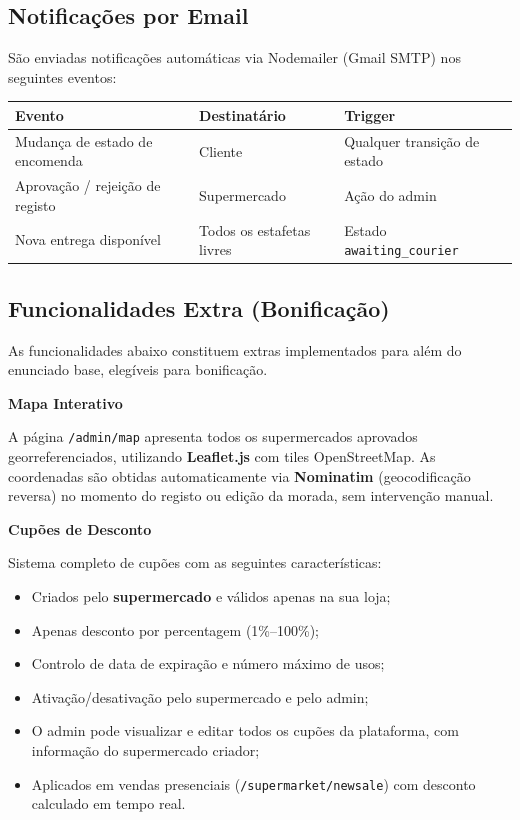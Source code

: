 \documentclass[12pt,a4paper]{article}
\begin{document}
\subsection{Notificações por Email}

São enviadas notificações automáticas via Nodemailer (Gmail SMTP) nos seguintes eventos:

\begin{center}
\begin{tabular}{lll}
\toprule
\textbf{Evento} & \textbf{Destinatário} & \textbf{Trigger} \\
\midrule
Mudança de estado de encomenda & Cliente & Qualquer transição de estado \\
Aprovação / rejeição de registo & Supermercado & Ação do admin \\
Nova entrega disponível & Todos os estafetas livres & Estado \texttt{awaiting\_courier} \\
\bottomrule
\end{tabular}
\end{center}

\subsection{Funcionalidades Extra (Bonificação)}

\begin{infobox}
As funcionalidades abaixo constituem extras implementados para além do enunciado base, elegíveis para bonificação.
\end{infobox}

\vspace{0.3cm}
\textbf{Mapa Interativo}

A página \texttt{/admin/map} apresenta todos os supermercados aprovados georreferenciados, utilizando \textbf{Leaflet.js} com tiles OpenStreetMap. As coordenadas são obtidas automaticamente via \textbf{Nominatim} (geocodificação reversa) no momento do registo ou edição da morada, sem intervenção manual.

\vspace{0.3cm}
\textbf{Cupões de Desconto}

Sistema completo de cupões com as seguintes características:
\begin{itemize}[leftmargin=*, label=\textcolor{primaryblue}{\textbullet}]
  \item Criados pelo \textbf{supermercado} e válidos apenas na sua loja;
  \item Apenas desconto por percentagem (1\%--100\%);
  \item Controlo de data de expiração e número máximo de usos;
  \item Ativação/desativação pelo supermercado e pelo admin;
  \item O admin pode visualizar e editar todos os cupões da plataforma, com informação do supermercado criador;
  \item Aplicados em vendas presenciais (\texttt{/supermarket/newsale}) com desconto calculado em tempo real.
\end{itemize}
\end{document}
